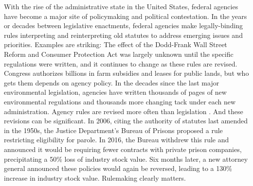 With the rise of the administrative state in the United States, federal agencies have become a major site of policymaking and political contestation. In the years or decades between legislative enactments, federal agencies make legally-binding rules interpreting and reinterpreting old statutes to address emerging issues and priorities. %
Examples are striking: The effect of the Dodd-Frank Wall Street Reform and Consumer Protection Act was largely unknown until the specific regulations were written, and it continues to change as these rules are revised. 
Congress authorizes billions in farm subsidies and leases for public lands, but who gets them depends on agency policy. In the decades since the last major environmental legislation, agencies have written thousands of pages of new environmental regulations and thousands more changing tack under each new administration. Agency rules are revised more often than legislation \citep{Wagner2017DynamicRulemaking}. And these revisions can be significant. In 2006, citing the authority of statutes last amended in the 1950s, the Justice Department's Bureau of Prisons proposed a rule restricting eligibility for parole. In 2016, the Bureau withdrew this rule and announced it would be requiring fewer contracts with private prison companies, precipitating a 50\% loss of industry stock value. Six months later, a new attorney general announced these policies would again be reversed, leading to a 130\% increase in industry stock value. %
Rulemaking clearly matters.

